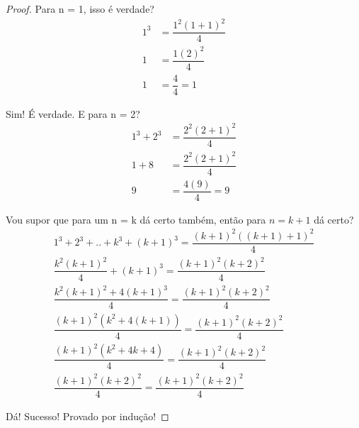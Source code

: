 \documentclass{article}
\begin{document}
\begin{proof}
	Para n = 1, isso é verdade?
\begin{equation}
\begin{split}
	1^3 & = \dfrac{1^2(1+1)^2}{4} \\
	1 & = \dfrac{1(2)^2}{4} \\
	1 & = \dfrac{4}{4} = 1
\end{split}
\end{equation}

	Sim! É verdade. E para n = 2?
\begin{equation}
\begin{split}
	1^3 + 2^3 & = \dfrac{2^2(2+1)^2}{4} \\
	1 + 8& = \dfrac{2^2(2+1)^2}{4} \\
	9 & = \dfrac{4(9)}{4} = 9
\end{split}
\end{equation}

	Vou supor que para um n = k dá certo também, então para $n = k + 1$ dá certo?
\begin{equation}
\begin{split}
	1^3 + 2^3 + .. + k^3 + (k+1)^3 = \dfrac{(k+1)^2((k+1)+1)^2}{4} \\
	\dfrac{k^2(k+1)^2}{4} + (k+1)^3 = \dfrac{ (k+1)^2(k+2)^2 }{ 4 } \\
	\dfrac{k^2(k+1)^2 + 4(k+1)^3}{4}  = \dfrac{ (k+1)^2(k+2)^2 }{ 4 } \\
	\dfrac{ (k+1)^2(k^2 + 4(k+1)) }{4}  = \dfrac{ (k+1)^2(k+2)^2 }{ 4 } \\
	\dfrac{ (k+1)^2(k^2 + 4k + 4) }{4}  = \dfrac{ (k+1)^2(k+2)^2 }{ 4 } \\
	\dfrac{ (k+1)^2(k + 2)^2 }{4}  = \dfrac{ (k+1)^2(k+2)^2 }{ 4 } 
\end{split}
\end{equation}

	Dá! Sucesso! Provado por indução!
\end{proof}
\end{document}
